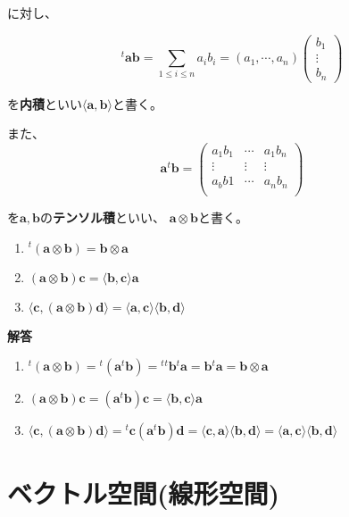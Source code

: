 \documentclass[dvipdfmx,autodetect-engine]{jsarticle}
\theoremstyle{definition}
\newcommand{\innerProduct}[2]{\langle \bm{#1}, \bm{#2} \rangle}
\newcommand{\tensorProduct}[2]{\bm{#1} \otimes \bm{#2}}
\begin{document}
に対し、


$$
{}^t\!\bm{a}\bm{b} = \sum_{1 \leq i \leq n} a_ib_i = (a_1, \cdots, a_n)\begin{pmatrix}
b_1 \\
\vdots \\
b_n
\end{pmatrix}
$$

を{\bf 内積}といい$\langle \bm{a}, \bm{b} \rangle$と書く。

また、
$$
\bm{a}{}^t\!\bm{b} = \begin{pmatrix}
a_1b_1 & \cdots & a_1b_n \\
\vdots & \vdots & \vdots \\
a_bb1 & \cdots & a_nb_n \\
\end{pmatrix}
$$

を$\bm{a}, \bm{b}$の{\bf テンソル積}といい、 $\bm{a} \otimes \bm{b}$と書く。


\begin{enumerate}
\renewcommand{\labelenumi}{(\arabic{enumi})}
\item ${}^t(\tensorProduct{a}{b}) = \tensorProduct{b}{a}$
\item $(\tensorProduct{a}{b})\bm{c} = \innerProduct{b}{c}\bm{a}$
\item $\innerProduct{c}{(\tensorProduct{a}{b})\bm{d}} = \innerProduct{a}{c}\innerProduct{b}{d}$
\end{enumerate}

{\bf 解答}

\begin{enumerate}
\renewcommand{\labelenumi}{(\arabic{enumi})}
\item ${}^t(\tensorProduct{a}{b}) = {}^t(\bm{a}{}^t\bm{b}) = {}^t{}^t\bm{b}{}^t\bm{a} = \bm{b}{}^t\bm{a} = \tensorProduct{b}{a}$
\item $(\tensorProduct{a}{b})\bm{c} = (\bm{a}{}^t\bm{b})\bm{c} = \innerProduct{b}{c}\bm{a}$
\item $\innerProduct{c}{(\tensorProduct{a}{b})\bm{d}} = {}^t\bm{c}(\bm{a}{}^t\bm{b})\bm{d} = \innerProduct{c}{a}\innerProduct{b}{d} = \innerProduct{a}{c}\innerProduct{b}{d}$
\end{enumerate}


\section{ベクトル空間(線形空間)}
\end{document}
